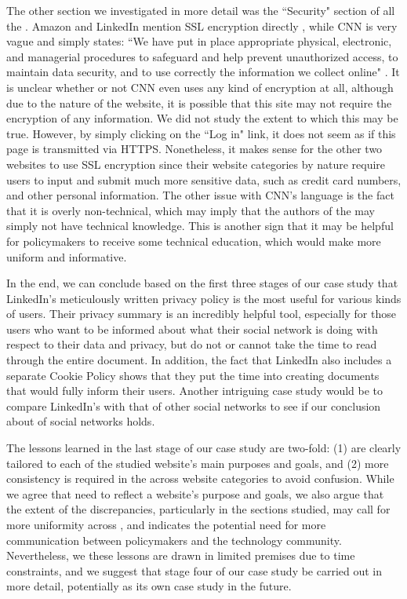 \documentclass{acm_proc_article-sp}
\begin{document}
The other section we investigated in more detail was the ``Security" section of all the \pps. Amazon and LinkedIn mention SSL encryption directly \cite{amazon,linkedin}, while CNN is very vague and simply states: ``We have put in place appropriate physical, electronic, and managerial procedures to safeguard and help prevent unauthorized access, to maintain data security, and to use correctly the information we collect online" \cite{cnn}. It is unclear whether or not CNN even uses any kind of encryption at all, although due to the nature of the website, it is possible that this site may not require the encryption of any information. We did not study the extent to which this may be true. However, by simply clicking on the ``Log in" link, it does not seem as if this page is transmitted via HTTPS. Nonetheless, it makes sense for the other two websites to use SSL encryption since their website categories by nature require users to input and submit much more sensitive data, such as credit card numbers, and other personal information. The other issue with CNN's language is the fact that it is overly non-technical, which may imply that the authors of the \pp may simply not have technical knowledge. This is another sign that it may be helpful for policymakers to receive some technical education, which would make \pps more uniform and informative.

In the end, we can conclude based on the first three stages of our case study that LinkedIn's meticulously written privacy policy is the most useful for various kinds of users. Their privacy summary is an incredibly helpful tool, especially for those users who want to be informed about what their social network is doing with respect to their data and privacy, but do not or cannot take the time to read through the entire document. In addition, the fact that LinkedIn also includes a separate Cookie Policy shows that they put the time into creating documents that would fully inform their users. Another intriguing case study would be to compare LinkedIn's \pp with that of other social networks to see if our conclusion about \pps of social networks holds. 

The lessons learned in the last stage of our case study are two-fold: (1) \pps are clearly tailored to each of the studied website's main purposes and goals, and (2) more consistency is required in the \pps across website categories to avoid confusion. While we agree that \pps need to reflect a website's purpose and goals, we also argue that the extent of the discrepancies, particularly in the sections studied, may call for more uniformity across \pps, and indicates the potential need for more communication between policymakers and the technology community. Nevertheless, we these lessons are drawn in limited premises due to time constraints, and we suggest that stage four of our case study be carried out in more detail, potentially as its own case study in the future.
\end{document}
